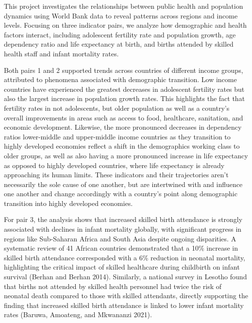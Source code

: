 \documentclass[
  letterpaper,
  DIV=11,
  numbers=noendperiod]{scrartcl}
\begin{document}
This project investigates the relationships between public health and
population dynamics using World Bank data to reveal patterns across
regions and income levels. Focusing on three indicator pairs, we analyze
how demographic and health factors interact, including adolescent
fertility rate and population growth, age dependency ratio and life
expectancy at birth, and births attended by skilled health staff and
infant mortality rates.

Both pairs 1 and 2 supported trends across countries of different income
groups, attributed to phenomena associated with demographic transition.
Low income countries have experienced the greatest decreases in
adolescent fertility rates but also the largest increase in population
growth rates. This highlights the fact that fertility rates in not
adolescents, but older population as well as a country's overall
improvements in areas such as access to food, healthcare, sanitation,
and economic development. Likewise, the more pronounced decreases in
dependency ratios lower-middle and upper-middle income countries as they
transition to highly developed economies reflect a shift in the
demographics working class to older groups, as well as also having a
more pronounced increase in life expectancy as opposed to highly
developed countries, where life expectancy is already approaching its
human limits. These indicators and their trajectories aren't necessarily
the sole cause of one another, but are intertwined with and influence
one another and change accordingly with a country's point along
demographic transition into highly developed economies.

For pair 3, the analysis shows that increased skilled birth attendance
is strongly associated with declines in infant mortality globally, with
significant progress in regions like Sub-Saharan Africa and South Asia
despite ongoing disparities. A systematic review of 41 African countries
demonstrated that a 10\% increase in skilled birth attendance
corresponded with a 6\% reduction in neonatal mortality, highlighting
the critical impact of skilled healthcare during childbirth on infant
survival (Berhan and Berhan 2014). Similarly, a national survey in
Lesotho found that births not attended by skilled health personnel had
twice the risk of neonatal death compared to those with skilled
attendants, directly supporting the finding that increased skilled birth
attendance is linked to lower infant mortality rates (Baruwa, Amoateng,
and Mkwananzi 2021).
\end{document}

